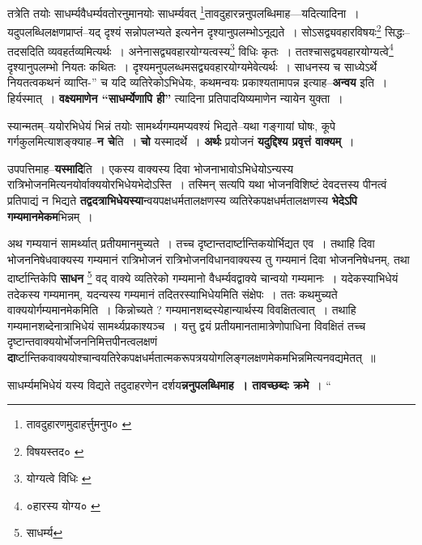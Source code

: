 \documentclass[article,12pt,a4paper]{memoir}
\begin{document}
	तत्रेति तयोः साधर्म्यवैधर्म्यवतोरनुमानयोः साधर्म्यवत् \footnote{तावदुहारणमुदाहर्त्तुमनुप० \cite{dp-msC} \cite{dp-msB}}तावदुहारन्ननुपलब्धिमाह—यदित्यादिना । यदुपलब्धिलक्षणप्राप्तं--यद् दृश्यं सन्नोपलभ्यते इत्यनेन दृश्यानुपलम्भोऽनूद्यते । सोऽसद्व्यवहारविषयः\footnote{विषयस्तद० \cite{dp-msB} \cite{dp-msC} \cite{dp-msD}} सिद्धः--तदसदिति व्यवहर्तव्यमित्यर्थः । अनेनासद्व्यवहारयोग्यत्वस्य\footnote{योग्यत्वे विधिः \cite{dp-msB}} विधिः कृतः । ततश्चासद्व्यवहारयोग्यत्वे\footnote{०हारस्य योग्य० \cite{dp-msA} \cite{dp-msB} \cite{dp-edP} \cite{dp-edH} \cite{dp-edE} \cite{dp-edN}} दृश्यानुपलम्भो नियतः कथितः । दृश्यमनुपलब्धमसद्व्यवहारयोग्यमेवेत्यर्थः । साधनस्य च साध्येऽर्थे नियतत्वकथनं व्याप्ति-” च यदि व्यतिरेकोऽभिधेयः, कथमन्वयः प्रकाश्यतामापन्न इत्याह--\textbf{अन्वय} इति । हिर्यस्मात् । \textbf{वक्ष्यमाणेन “साधर्म्येणापि ही”} त्यादिना प्रतिपादयिष्यमाणेन न्यायेन युक्ता ।
	\pend
      

	  \pstart स्यान्मतम्--ययोरभिधेयं भिन्नं तयोः सामर्थ्यगम्यमप्यवश्यं भिद्यते--यथा गङ्गायां घोषः, कूपे गर्गकुलमित्याशङ्क्याह--\textbf{न चे}ति । \textbf{चो} यस्मादर्थे । \textbf{अर्थः} प्रयोजनं \textbf{यदुद्दिश्य प्रवृत्तं वाक्यम्} ।
	\pend
      

	  \pstart उपपत्तिमाह--\textbf{यस्मादि}ति । एकस्य वाक्यस्य दिवा भोजनाभावोऽभिधेयोऽन्यस्य रात्रिभोजनमित्यनयोर्वाक्य\leavevmode{}योरभिधेयभेदोऽस्ति । तस्मिन् सत्यपि यथा भोजनविशिष्टं देवदत्तस्य पीनत्वं प्रतिपाद्यं न भिद्यते \textbf{तद्वदत्राभिधेयस्या}न्वयपक्षधर्मतालक्षणस्य व्यतिरेकपक्षधर्मतालक्षणस्य \textbf{भेदेऽपि गम्यमानमेकम}भिन्नम् ।
	\pend
      

	  \pstart अथ गम्ययानं सामर्थ्यात् प्रतीयमानमुच्यते । तच्च दृष्टान्तदार्ष्टान्तिकयोर्भिद्यत एव । तथाहि दिवा भोजननिषेधवाक्यस्य गम्यमानं रात्रिभोजनं रात्रिभोजनविधानवाक्यस्य तु गम्यमानं दिवा भोजननिषेधनम्, तथा दार्ष्टान्तिकेपि \textbf{साधन} \footnote{साधर्म्य} वद् वाक्ये व्यतिरेको गम्यमानो वैधर्म्यवद्वाक्ये चान्वयो गम्यमानः । यदेकस्याभिधेयं तदेकस्य गम्यमानम्, यदन्यस्य गम्यमानं तदितरस्याभिधेयमिति संक्षेपः । ततः कथमुच्यते वाक्ययोर्गम्यमानमेकमिति । किन्नोच्यते ? गम्यमानशब्दस्येहान्यार्थस्य विवक्षितत्वात् । तथाहि गम्यमानशब्देनात्राभिधेयं सामर्थ्यप्रकाश्यञ्च । यत्तु द्वयं प्रतीयमानतामात्रेणोपाधिना विवक्षितं तच्च दृष्टान्तवाक्ययोर्भोजननिमित्तपीनत्वलक्षणं \textbf{दा}र्ष्टान्तिकवाक्ययोश्चान्वयतिरेकपक्षधर्मतात्मकरूपत्रययोगलिङ्गलक्षणमेकमभिन्नमित्यनवद्यमेतत् ॥
	\pend
      

	  \pstart साधर्म्यमभिधेयं यस्य विद्यते तदुदाहरणेन दर्शय\textbf{न्ननुपलब्धिमाह । तावच्छब्दः क्रमे} ।  \leavevmode{} “
	  
\end{document}
